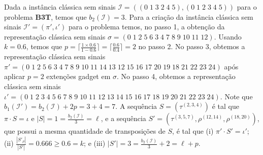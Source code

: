 \begin{example}\label{example:QBULCCOI}
  Dada a instância clássica sem sinais $\mathcal{I} = ((0 \;1 \; 3 \; 2 \; 4 \; 5),(0 \; 1 \; 2 \; 3 \; 4 \; 5))$ para o problema \textbf{B3T}, temos que $b_2(\mathcal{I}) = 3$. Para a criação da instância clássica sem sinais $\mathcal{I'}=(\pi',\iota')$ para o problema \SbPRT{} temos, no passo 1, a obtenção da representação clássica sem sinais $\sigma = ({0} \; {1} \; {2} \; {5} \; {6} \; {3} \; {4} \; {7} \; {8} \; {9} \; {10} \; {11} \; {12})$. Usando $k = 0.6$, temos que $p = \lceil\frac{1\times 0.6}{1 - 0.6}\rceil = \lceil\frac{0.6}{0.4}\rceil = 2$ no passo 2. No passo 3, obtemos a representação clássica sem sinais $\pi' = ({0} \; {1} \; {2} \; {5} \; {6} \; {3} \; {4} \; {7} \; {8} \; {9} \; {10} \; {11} \; {14} \; {13} \; {12} \; {15} \; {16} \; {17} \; {20} \; {19} \; {18} \; {21} \; {22} \; {23} \;{24})$ após aplicar $p = 2$ extenções gadget em $\sigma$. No passo 4, obtemos a representação clássica sem sinais $\iota' = ({0} \; {1} \; {2} \; {3} \; {4} \; {5} \; {6} \; {7} \; {8} \; {9} \; {10} \; {11} \; {12} \; {13} \; {14} \; {15} \; {16} \; {17} \; {18} \; {19} \; {20} \; {21} \; {22} \; {23} \; {24})$. Note que $b_1(\mathcal{I'}) = b_2(\mathcal{I}) + 2p = 3 + 4 = 7$. A sequência $S = (\tau^{(2,3,4)})$ é tal que $\pi \cdot S = \iota$ e $|S| = 1 = \frac{b_2(\mathcal{I})}{3} = \ell$, e a sequência $S' = (\tau^{(3,5,7)},\rho^{(12,14)},\rho^{(18,20)})$, que possui a mesma quantidade de transposições de $S$, é tal que (i) $\pi' \cdot S' = \iota'$; (ii) $\frac{|S'_\rho|}{|S'|} = 0.666 \ge 0.6 = k$; e (iii) $|S'| = 3 = \frac{b_2(\mathcal{I})}{3} + 2 = \ell+p$.
\end{example}
